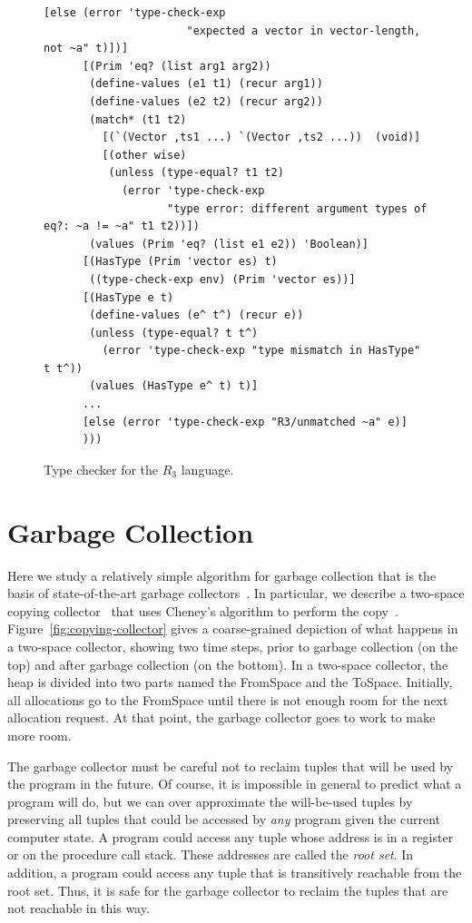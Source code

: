 \documentclass[11pt]{book}
\begin{document}
\begin{figure}[tp]
\begin{lstlisting}[basicstyle=\ttfamily\scriptsize]
         [else (error 'type-check-exp
                      "expected a vector in vector-length, not ~a" t)])]
      [(Prim 'eq? (list arg1 arg2))
       (define-values (e1 t1) (recur arg1))
       (define-values (e2 t2) (recur arg2))
       (match* (t1 t2)
         [(`(Vector ,ts1 ...) `(Vector ,ts2 ...))  (void)]
         [(other wise)
          (unless (type-equal? t1 t2)
            (error 'type-check-exp
                   "type error: different argument types of eq?: ~a != ~a" t1 t2))])
       (values (Prim 'eq? (list e1 e2)) 'Boolean)]
      [(HasType (Prim 'vector es) t)
       ((type-check-exp env) (Prim 'vector es))]
      [(HasType e t)
       (define-values (e^ t^) (recur e))
       (unless (type-equal? t t^)
         (error 'type-check-exp "type mismatch in HasType" t t^))
       (values (HasType e^ t) t)]
      ...
      [else (error 'type-check-exp "R3/unmatched ~a" e)]
      )))
\end{lstlisting}
\caption{Type checker for the $R_3$ language.}
\label{fig:type-check-R3}
\end{figure}


\section{Garbage Collection}
\label{sec:GC}

Here we study a relatively simple algorithm for garbage collection
that is the basis of state-of-the-art garbage
collectors~\citep{Lieberman:1983aa,Ungar:1984aa,Jones:1996aa,Detlefs:2004aa,Dybvig:2006aa,Tene:2011kx}. In
particular, we describe a two-space copying
collector~\citep{Wilson:1992fk} that uses Cheney's algorithm to
perform the
copy~\citep{Cheney:1970aa}.
Figure~\ref{fig:copying-collector} gives a
coarse-grained depiction of what happens in a two-space collector,
showing two time steps, prior to garbage collection (on the top) and
after garbage collection (on the bottom). In a two-space collector,
the heap is divided into two parts named the FromSpace and the
ToSpace. Initially, all allocations go to the FromSpace until there is
not enough room for the next allocation request. At that point, the
garbage collector goes to work to make more room.

The garbage collector must be careful not to reclaim tuples that will
be used by the program in the future. Of course, it is impossible in
general to predict what a program will do, but we can over approximate
the will-be-used tuples by preserving all tuples that could be
accessed by \emph{any} program given the current computer state.  A
program could access any tuple whose address is in a register or on
the procedure call stack. These addresses are called the \emph{root
  set}. In addition, a program could access any tuple that is
transitively reachable from the root set. Thus, it is safe for the
garbage collector to reclaim the tuples that are not reachable in this
way.
\end{document}
